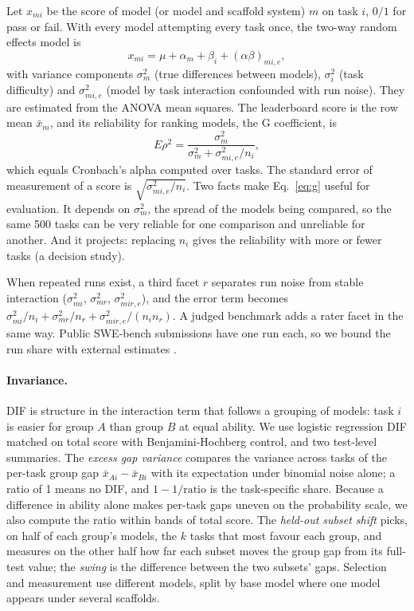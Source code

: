 \documentclass[11pt]{article}
\begin{document}
Let $x_{mi}$ be the score of model (or model and scaffold system) $m$ on task $i$, $0/1$ for pass or fail. With every model attempting every task once, the two-way random effects model is
\begin{equation}
x_{mi} = \mu + \alpha_m + \beta_i + (\alpha\beta)_{mi,e},
\end{equation}
with variance components $\sigma^2_m$ (true differences between models), $\sigma^2_i$ (task difficulty) and $\sigma^2_{mi,e}$ (model by task interaction confounded with run noise). They are estimated from the ANOVA mean squares. The leaderboard score is the row mean $\bar x_m$, and its reliability for ranking models, the G coefficient, is
\begin{equation}
E\rho^2 = \frac{\sigma^2_m}{\sigma^2_m + \sigma^2_{mi,e}/n_i},
\label{eq:g}
\end{equation}
which equals Cronbach's alpha computed over tasks. The standard error of measurement of a score is $\sqrt{\sigma^2_{mi,e}/n_i}$. Two facts make Eq.~\ref{eq:g} useful for evaluation. It depends on $\sigma^2_m$, the spread of the models being compared, so the same 500 tasks can be very reliable for one comparison and unreliable for another. And it projects: replacing $n_i$ gives the reliability with more or fewer tasks (a decision study).

When repeated runs exist, a third facet $r$ separates run noise from stable interaction ($\sigma^2_{mi}$, $\sigma^2_{mr}$, $\sigma^2_{mir,e}$), and the error term becomes $\sigma^2_{mi}/n_i + \sigma^2_{mr}/n_r + \sigma^2_{mir,e}/(n_i n_r)$. A judged benchmark adds a rater facet in the same way. Public SWE-bench submissions have one run each, so we bound the run share with external estimates \citep{bjarnason2026randomness}.

\paragraph{Invariance.} DIF is structure in the interaction term that follows a grouping of models: task $i$ is easier for group $A$ than group $B$ at equal ability. We use logistic regression DIF matched on total score \citep{swaminathan1990logistic} with Benjamini-Hochberg control, and two test-level summaries. The \emph{excess gap variance} compares the variance across tasks of the per-task group gap $\bar x_{Ai} - \bar x_{Bi}$ with its expectation under binomial noise alone; a ratio of 1 means no DIF, and $1 - 1/\text{ratio}$ is the task-specific share. Because a difference in ability alone makes per-task gaps uneven on the probability scale, we also compute the ratio within bands of total score. The \emph{held-out subset shift} picks, on half of each group's models, the $k$ tasks that most favour each group, and measures on the other half how far each subset moves the group gap from its full-test value; the \emph{swing} is the difference between the two subsets' gaps. Selection and measurement use different models, split by base model where one model appears under several scaffolds.
\end{document}
